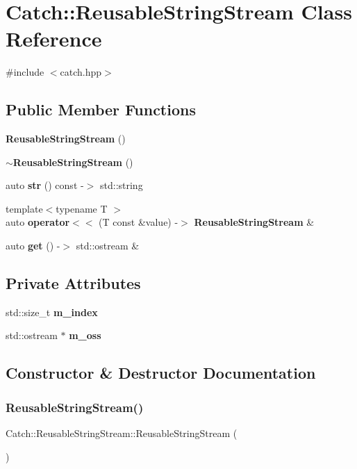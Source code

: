 \section{Catch\+::Reusable\+String\+Stream Class Reference}
\label{class_catch_1_1_reusable_string_stream}


{\ttfamily \#include $<$catch.\+hpp$>$}

\subsection*{Public Member Functions}
\begin{DoxyCompactItemize}
\item 
\textbf{ Reusable\+String\+Stream} ()
\item 
\textbf{ $\sim$\+Reusable\+String\+Stream} ()
\item 
auto \textbf{ str} () const -\/$>$ std\+::string
\item 
{\footnotesize template$<$typename T $>$ }\\auto \textbf{ operator$<$$<$} (T const \&value) -\/$>$ \textbf{ Reusable\+String\+Stream} \&
\item 
auto \textbf{ get} () -\/$>$ std\+::ostream \&
\end{DoxyCompactItemize}
\subsection*{Private Attributes}
\begin{DoxyCompactItemize}
\item 
std\+::size\+\_\+t \textbf{ m\+\_\+index}
\item 
std\+::ostream $\ast$ \textbf{ m\+\_\+oss}
\end{DoxyCompactItemize}


\subsection{Constructor \& Destructor Documentation}
\mbox{\label{class_catch_1_1_reusable_string_stream_a9b3f8c52b0d2d63ffd825297a9c09781}} 
\subsubsection{ReusableStringStream()}
{\footnotesize\ttfamily Catch\+::\+Reusable\+String\+Stream\+::\+Reusable\+String\+Stream (\begin{DoxyParamCaption}{ }\end{DoxyParamCaption})}

